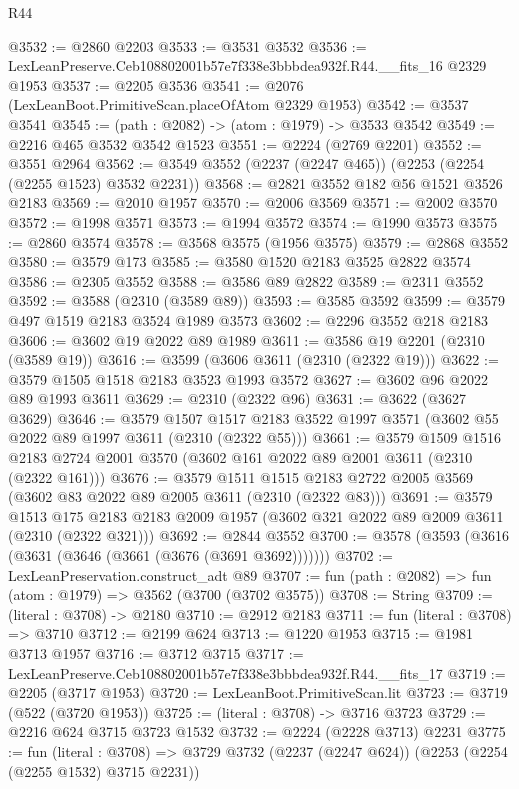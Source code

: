 \begin{lexlean}{R44}
\begin{coremodule}
@3532 := @2860 @2203
@3533 := @3531 @3532
@3536 := LexLeanPreserve.Ceb108802001b57e7f338e3bbbdea932f.R44.__fits_16 @2329 @1953
@3537 := @2205 @3536
@3541 := @2076 (LexLeanBoot.PrimitiveScan.placeOfAtom @2329 @1953)
@3542 := @3537 @3541
@3545 := (path : @2082) -> (atom : @1979) -> @3533 @3542
@3549 := @2216 @465 @3532 @3542 @1523
@3551 := @2224 (@2769 @2201)
@3552 := @3551 @2964
@3562 := @3549 @3552 (@2237 (@2247 @465)) (@2253 (@2254 (@2255 @1523) @3532 @2231))
@3568 := @2821 @3552 @182 @56 @1521 @3526 @2183
@3569 := @2010 @1957
@3570 := @2006 @3569
@3571 := @2002 @3570
@3572 := @1998 @3571
@3573 := @1994 @3572
@3574 := @1990 @3573
@3575 := @2860 @3574
@3578 := @3568 @3575 (@1956 @3575)
@3579 := @2868 @3552
@3580 := @3579 @173
@3585 := @3580 @1520 @2183 @3525 @2822 @3574
@3586 := @2305 @3552
@3588 := @3586 @89 @2822
@3589 := @2311 @3552
@3592 := @3588 (@2310 (@3589 @89))
@3593 := @3585 @3592
@3599 := @3579 @497 @1519 @2183 @3524 @1989 @3573
@3602 := @2296 @3552 @218 @2183
@3606 := @3602 @19 @2022 @89 @1989
@3611 := @3586 @19 @2201 (@2310 (@3589 @19))
@3616 := @3599 (@3606 @3611 (@2310 (@2322 @19)))
@3622 := @3579 @1505 @1518 @2183 @3523 @1993 @3572
@3627 := @3602 @96 @2022 @89 @1993 @3611
@3629 := @2310 (@2322 @96)
@3631 := @3622 (@3627 @3629)
@3646 := @3579
    @1507
    @1517
    @2183
    @3522
    @1997
    @3571
    (@3602 @55 @2022 @89 @1997 @3611 (@2310 (@2322 @55)))
@3661 := @3579
    @1509
    @1516
    @2183
    @2724
    @2001
    @3570
    (@3602 @161 @2022 @89 @2001 @3611 (@2310 (@2322 @161)))
@3676 := @3579
    @1511
    @1515
    @2183
    @2722
    @2005
    @3569
    (@3602 @83 @2022 @89 @2005 @3611 (@2310 (@2322 @83)))
@3691 := @3579
    @1513
    @175
    @2183
    @2183
    @2009
    @1957
    (@3602 @321 @2022 @89 @2009 @3611 (@2310 (@2322 @321)))
@3692 := @2844 @3552
@3700 := @3578 (@3593 (@3616 (@3631 (@3646 (@3661 (@3676 (@3691 @3692)))))))
@3702 := LexLeanPreservation.construct_adt @89
@3707 := fun (path : @2082) => fun (atom : @1979) => @3562 (@3700 (@3702 @3575))
@3708 := String
@3709 := (literal : @3708) -> @2180
@3710 := @2912 @2183
@3711 := fun (literal : @3708) => @3710
@3712 := @2199 @624
@3713 := @1220 @1953
@3715 := @1981 @3713 @1957
@3716 := @3712 @3715
@3717 := LexLeanPreserve.Ceb108802001b57e7f338e3bbbdea932f.R44.__fits_17
@3719 := @2205 (@3717 @1953)
@3720 := LexLeanBoot.PrimitiveScan.lit
@3723 := @3719 (@522 (@3720 @1953))
@3725 := (literal : @3708) -> @3716 @3723
@3729 := @2216 @624 @3715 @3723 @1532
@3732 := @2224 (@2228 @3713) @2231
@3775 := fun (literal : @3708) =>
  @3729
    @3732
    (@2237 (@2247 @624))
    (@2253 (@2254 (@2255 @1532) @3715 @2231))

\end{coremodule}
\end{lexlean}
